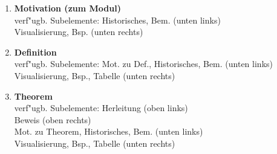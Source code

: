 \begin{enumerate}
\item \textbf{Motivation (zum Modul)}\\
verf"ugb. Subelemente: Historisches, Bem. \hfill{(unten links)}\\
\phantom{verf"ugb. Subelemente: }Visualisierung, Bsp. \hfill{(unten rechts)}\\[-5mm]
\begin{center}
\end{center}
\item \textbf{Definition}\\
verf"ugb. Subelemente: Mot. zu Def., Historisches, Bem. \hfill{(unten links)}\\
\phantom{verf"ugb. Subelemente: }Visualisierung, Bsp., Tabelle \hfill{(unten rechts)}\\[-5mm]
\begin{center}
\end{center}
\item \textbf{Theorem}\\
verf"ugb. Subelemente: Herleitung \hfill{(oben links)}\\
\phantom{verf"ugb. Subelemente: }Beweis \hfill{(oben rechts)}\\
\phantom{verf"ugb. Subelemente: }Mot. zu Theorem, Historisches, Bem. \hfill{(unten links)}\\
\phantom{verf"ugb. Subelemente: }Visualisierung, Bsp., Tabelle \hfill{(unten rechts)}\\[-5mm]
\begin{center}
\end{center}

\clearpage


\end{enumerate}
